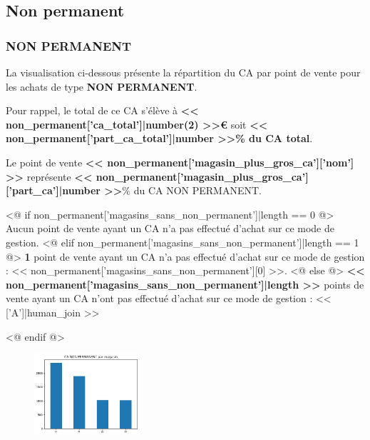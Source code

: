 \subsection{Non permanent}

\begin{frame}
    \tiny
    \frametitle{NON PERMANENT}

    La visualisation ci-dessous présente la répartition du CA par point de vente pour les achats de type \textbf{NON PERMANENT}.\par
    Pour rappel, le total de ce CA s’élève à \textbf{<< non_permanent['ca_total']|number(2) >>€} soit \textbf{<< non_permanent['part_ca_total']|number >>\% du CA total}.\par

    Le point de vente \textbf{<< non_permanent['magasin_plus_gros_ca']['nom'] >>} représente \textbf{<< non_permanent['magasin_plus_gros_ca']['part_ca']|number >>}\% du CA NON PERMANENT.\par

    <@ if non_permanent['magasins_sans_non_permanent']|length == 0 @>
        Aucun point de vente ayant un CA n'a pas effectué d'achat sur ce mode de gestion.
    <@ elif non_permanent['magasins_sans_non_permanent']|length == 1 @>
        \textbf{1} point de vente ayant un CA n'a pas effectué d'achat sur ce mode de gestion : << non_permanent['magasins_sans_non_permanent'][0] >>.
    <@ else @>
        \textbf{<< non_permanent['magasins_sans_non_permanent']|length >>} points de vente ayant un CA n'ont pas effectué d'achat sur ce mode de gestion : << ['A']|human_join >>\par
    <@ endif @>
    \par

    \begin{figure}[h]
        \centering
        \includegraphics[height=3cm]{assets/__ca_non_permanent_par_magasin}
    \end{figure}
\end{frame}
